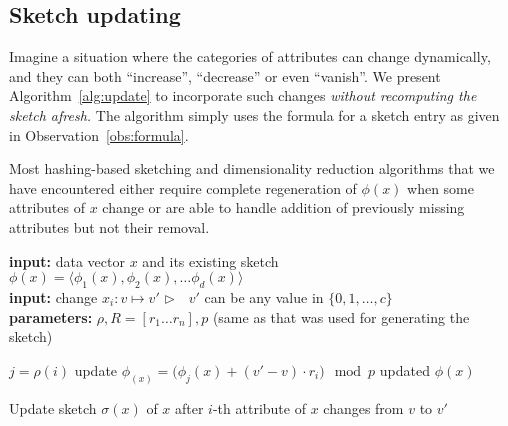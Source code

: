 \subsection{Sketch updating}

Imagine a situation where the categories of attributes can change dynamically, and they can both ``increase'', ``decrease'' or even ``vanish''. We present Algorithm~\ref{alg:update} to incorporate such changes {\em without recomputing the sketch afresh.} The algorithm simply uses the formula for a sketch entry as given in Observation~\ref{obs:formula}.

Most hashing-based sketching and dimensionality reduction algorithms that we have encountered either require complete regeneration of $\phi(x)$ when some attributes of $x$ change or are able to handle addition of previously missing attributes but not their removal.
    \begin{algorithm}[t]
	\noindent\hspace*{\algorithmicindent} \textbf{input:} data
	vector $x$ and its existing sketch $\phi(x)=\langle \phi_1(x),
	\phi_2(x), \ldots \phi_d(x) \rangle$\\
	\noindent\hspace*{\algorithmicindent} \textbf{input:} change $x_i:v
	\mapsto v'$ \hfill $\rhd \quad v'$ can be any value in $\{0,1,\ldots, c\}$\\
	\noindent\hspace*{\algorithmicindent} \textbf{parameters:} $\rho,R=[r_1 \ldots r_n], p$
	(same as that was used for generating the sketch) 
	\begin{algorithmic}[1]
	    \State $j=\rho(i)$
	    \State update $\phi_(x) = \big( \phi_j(x) + (v'-v)\cdot r_i
	    \big) \mod{p}$
	    \State \Return updated $\phi(x)$
	\end{algorithmic}
	\caption{Update sketch $\sigma(x)$ of $x$ after $i$-th attribute of
	$x$ changes from $v$ to $v'$ \label{alg:update}}
    \end{algorithm}



%

